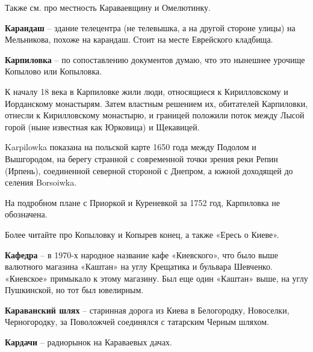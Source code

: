 Также см. про местность Караваевщину и Омелютинку.\\ 

\medskip


\textbf{Карандаш} – здание телецентра (не телевышка, а на другой стороне улицы) на Мельникова, похоже на карандаш. Стоит на месте Еврейского кладбища.\\

\medskip


\textbf{Карпиловка} – по сопоставлению документов думаю, что это нынешнее урочище Копылово или Копыловка.

К началу 18 века в Карпиловке жили люди, относящиеся к Кирилловскому и Иорданскому монастырям. Затем властным решением их, обитателей Карпиловки, отнесли к Кирилловскому монастырю, и границей положили поток между Лысой горой (ныне известная как Юрковица) и Щекавицей.

Karpilowka показана на польской карте 1650 года между Подолом и Вышгородом, на берегу странной с современной точки зрения реки Репин (Ирпень), соединенной северной стороной с Днепром, а южной доходящей до селения Borsoiwka. 

На подробном плане с Приоркой и Куреневкой за 1752 год, Карпиловка не обозначена.

Более читайте про Копыловку и Копырев конец, а также «Ересь о Киеве».\\

\medskip

\textbf{Кафедра} – в 1970-х народное название кафе «Киевского», что было выше валютного магазина «Каштан» на углу Крещатика и бульвара Шевченко. «Киевское» примыкало к этому магазину. Был еще один «Каштан» выше, на углу Пушкинской, но тот был ювелирным.\\

\medskip

\textbf{Караванский шлях} – старинная дорога из Киева в Белогородку, Новоселки, Черногородку, за Поволожчей соединялся с татарским Черным шляхом.\\

\medskip

\textbf{Кардачи} – радиорынок на Караваевых дачах.\\

